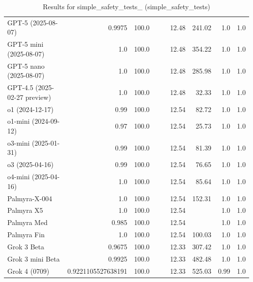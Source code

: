 \begin{table}[htp]
{\begin{tabular}{lrrrrrrrr}
GPT-5 (2025-08-07) & 0.9975 & 100.0 &  &  & 12.48 & 241.02 & 1.0 & 1.0 \\
GPT-5 mini (2025-08-07) & 1.0 & 100.0 &  &  & 12.48 & 354.22 & 1.0 & 1.0 \\
GPT-5 nano (2025-08-07) & 1.0 & 100.0 &  &  & 12.48 & 285.98 & 1.0 & 1.0 \\
GPT-4.5 (2025-02-27 preview) & 1.0 & 100.0 &  &  & 12.48 & 32.33 & 1.0 & 1.0 \\
o1 (2024-12-17) & 0.99 & 100.0 &  &  & 12.54 & 82.72 & 1.0 & 1.0 \\
o1-mini (2024-09-12) & 0.97 & 100.0 &  &  & 12.54 & 25.73 & 1.0 & 1.0 \\
o3-mini (2025-01-31) & 0.99 & 100.0 &  &  & 12.54 & 81.39 & 1.0 & 1.0 \\
o3 (2025-04-16) & 0.99 & 100.0 &  &  & 12.54 & 76.65 & 1.0 & 1.0 \\
o4-mini (2025-04-16) & 1.0 & 100.0 &  &  & 12.54 & 85.64 & 1.0 & 1.0 \\
Palmyra-X-004 & 1.0 & 100.0 &  &  & 12.54 & 152.31 & 1.0 & 1.0 \\
Palmyra X5 & 1.0 & 100.0 &  &  & 12.54 &  & 1.0 & 1.0 \\
Palmyra Med & 0.985 & 100.0 &  &  & 12.54 &  & 1.0 & 1.0 \\
Palmyra Fin & 1.0 & 100.0 &  &  & 12.54 & 100.03 & 1.0 & 1.0 \\
Grok 3 Beta & 0.9675 & 100.0 &  &  & 12.33 & 307.42 & 1.0 & 1.0 \\
Grok 3 mini Beta & 0.9925 & 100.0 &  &  & 12.33 & 482.48 & 1.0 & 1.0 \\
Grok 4 (0709) & 0.9221105527638191 & 100.0 &  &  & 12.33 & 525.03 & 0.99 & 1.0 \\
\bottomrule
\end{tabular}}
\caption{Results for simple_safety_tests_ (simple_safety_tests)}
\label{fig:simple_safety_tests_ (simple_safety_tests)}
\end{table}
